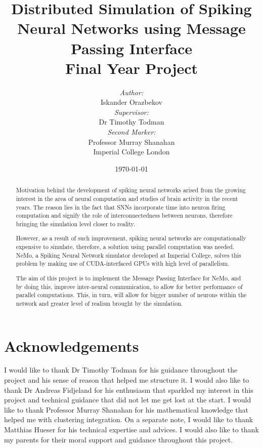 \documentclass[12pt]{report}
\title{\LARGE Distributed Simulation of Spiking Neural Networks using Message Passing Interface \\ \vspace{7mm} \large Final Year Project}
\author{ \emph{Author:} \\ Iskander Orazbekov \vspace{5 mm} \\ \emph{Supervisor:} \\ Dr Timothy Todman \vspace{5 mm} \\ \emph{Second Marker:} \\ Professor Murray Shanahan \vspace{56 mm} \\ Imperial College London}
\date{\today}
\begin{document}
\maketitle

\begin{abstract}

Motivation behind the development of spiking neural networks arised from the growing interest in the area of neural 
computation and studies of brain activity in the recent years. The reason lies in the fact that SNNs incorporate time
into neuron firing computation and signify the role of interconnectedness between neurons, therefore bringing the simulation 
level closer to reality.

However, as a result of such improvement, spiking neural networks are computationally expensive to simulate, therefore, a solution 
using parallel computation was needed. NeMo, a Spiking Neural Network simulator developed at Imperial College, solves this problem 
by making use of CUDA-interfaced GPUs with high level of parallelism.

The aim of this project is to implement the Message Passing Interface for NeMo, and by doing this, improve inter-neural communication, 
to allow for better performance of parallel computations. This, in turn, will allow for bigger number of neurons within the network 
and greater level of realism brought by the simulation.

\end{abstract}

\clearpage

\chapter*{Acknowledgements}
\thispagestyle{empty}

I would like to thank Dr Timothy Todman for his guidance throughout the project and his sense of reason that helped me structure it. I would also like to thank Dr Andreas Fidjeland for his enthusiasm that sparkled my interest in this project and technical guidance that did not let me get lost at the start. I would like to thank Professor Murray Shanahan for his mathematical knowledge that helped me with clustering integration. On a separate note, I would like to thank Matthias Hueser for his technical expertise and advices.
I would also like to thank my parents for their moral support and guidance throughout this project.


\clearpage
\end{document}
